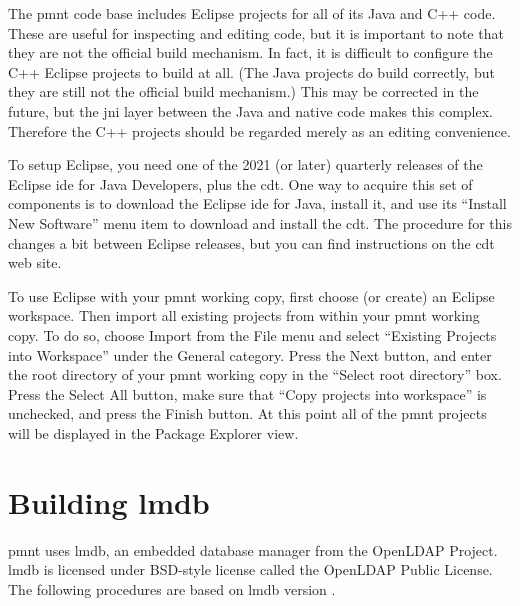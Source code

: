 The \ac{pmnt} code base includes Eclipse projects for all of its Java and C++ code.  These are useful for inspecting and editing code, but it is important to note that they are not the official build mechanism.  In fact, it is difficult to configure the C++ Eclipse projects to build at all.  (The Java projects do build correctly, but they are still not the official build mechanism.)  This may be corrected in the future, but the \ac{jni} layer between the Java and native code makes this complex.  Therefore the C++ projects should be regarded merely as an editing convenience.

To setup Eclipse, you need one of the 2021 (or later) quarterly releases of the Eclipse \ac{ide} for Java Developers, plus the \ac{cdt}.  One way to acquire this set of components is to download the Eclipse \ac{ide} for Java, install it, and use its ``Install New Software'' menu item to download and install the \ac{cdt}.  The procedure for this changes a bit between Eclipse releases, but you can find instructions on the \ac{cdt} web site.

To use Eclipse with your \ac{pmnt} working copy, first choose (or create) an Eclipse workspace.  Then import all existing projects from within your \ac{pmnt} working copy.  To do so, choose Import from the File menu and select ``Existing Projects into Workspace'' under the General category.  Press the Next button, and enter the root directory of your \ac{pmnt} working copy in the ``Select root directory'' box.  Press the Select All button, make sure that ``Copy projects into workspace'' is unchecked, and press the Finish button.  At this point all of the \ac{pmnt} projects will be displayed in the Package Explorer view.






\section{Building \acs*{lmdb}}
\label{sec:BuildingLMDB}

\ac{pmnt} uses \ac{lmdb}, an embedded database manager from the OpenLDAP Project.  \ac{lmdb} is licensed under BSD-style license called the OpenLDAP Public License.  The following procedures are based on \ac{lmdb} version \lmdbversion.

